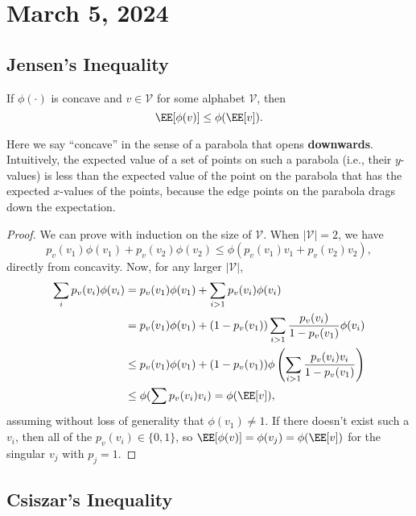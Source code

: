 \section{March 5, 2024}

\subsection{Jensen's Inequality}

\begin{theorem}
\thmlabel

If $\phi(\cdot)$ is concave and $v\in \mathcal{V}$ for some alphabet $\mathcal{V}$, then 
\[\EE[\phi(v)]\leq \phi(\EE[v]).\] 
\end{theorem}

Here we say ``concave'' in the sense of a parabola that opens \textbf{downwards}. Intuitively, the expected value of a set of points on such a parabola (i.e., their $y$-values) is less than the expected value of the point on the parabola that has the expected $x$-values of the points, because the edge points on the parabola drags down the expectation.  

\begin{proof}
	We can prove with induction on the size of $\mathcal{V}$. When $\vert \mathcal{V}\vert = 2$, we have 
	\[p_v(v_1)\phi(v_1) + p_v(v_2)\phi(v_2)\leq \phi(p_v(v_1)v_1 + p_v(v_2)v_2),\]
	directly from concavity. Now, for any larger $\vert \mathcal{V}\vert$,  
	\begin{align*}
		\sum_i p_v(v_i)\phi(v_i) &= p_v(v_1)\phi(v_1) + \sum_{i>1}p_v(v_i)\phi(v_i) \\
														 &= p_v(v_1)\phi(v_1) + (1-p_v(v_1))\sum_{i>1}\frac{p_v(v_i)}{1-p_v(v_1)}\phi(v_i) \\
														 &\leq p_v(v_1)\phi(v_1) + (1-p_v(v_1))\phi\left(\sum_{i>1}\frac{p_v(v_i)v_i}{1-p_v(v_1)}\right) \\
														 &\leq \phi(\sum p_v(v_i)v_i) = \phi(\EE[v]),
	\end{align*}
	assuming without loss of generality that $\phi(v_1)\neq 1$. If there doesn't exist such a $v_i$, then all of the $p_v(v_i)\in \{0,1\}$, so $\EE[\phi(v)]=\phi(v_j)=\phi(\EE[v])$ for the singular $v_j$ with $p_j=1$.
\end{proof}

\subsection{Csiszar's Inequality}

